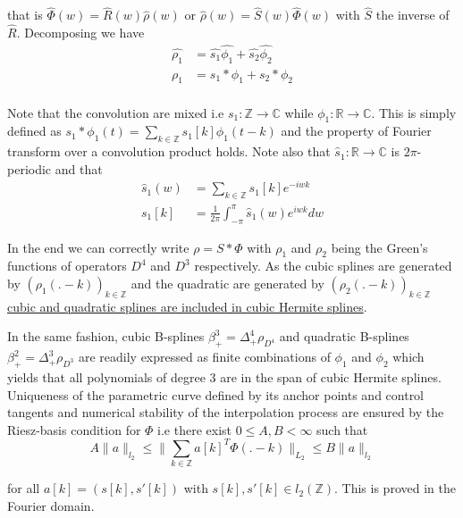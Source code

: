 \documentclass[a4paper, 11pt]{article}
\begin{document}
that is $\hat{\Phi}(w) = \hat{R}(w) \hat{\rho}(w)$ or $\hat{\rho}(w) = \hat{S}(w) \hat{\Phi}(w)$ with $\hat{S}$ the 
inverse of $\hat{R}$. Decomposing we have
\begin{align}
  \hat{\rho_1} &= \hat{s_1} \hat{\phi_1} + \hat{s_2} \hat{\phi_2} \\
  \rho_1 &= s_1 * \phi_1 + s_2 * \phi_2 \\
\end{align}

Note that the convolution are mixed i.e $s_1 : \mathbb{Z} \to \mathbb{C}$ while $\phi_1 : \mathbb{R} \to \mathbb{C}$.  
This is simply defined as $s_1 * \phi_1 (t) = \sum_{k \in \mathbb{Z}} s_1[k] \phi_1(t-k)$ and the property of Fourier 
transform over a convolution product holds. Note also that $\hat{s}_1 : \mathbb{R} \to \mathbb{C}$ is $2\pi$-periodic 
and that 
\begin{align*}
  \hat{s}_1(w) &= \sum_{k \in \mathbb{Z}} s_1[k] e^{-iwk} \\
  s_1[k] &= \frac{1}{2\pi}\int_{-\pi}^{\pi} \hat{s}_1(w) e^{iwk} dw
\end{align*}

In the end we can correctly write $\rho = S * \Phi$ with $\rho_1$ and $\rho_2$ being the Green's functions of operators 
$D^4$ and $D^3$ respectively. As the cubic splines are generated by ${(\rho_1(.-k))}_{k \in \mathbb{Z}}$ and the 
quadratic are generated by ${(\rho_2(.-k))}_{k \in \mathbb{Z}}$ \underline{cubic and quadratic splines are included in 
cubic Hermite splines}. 

In the same fashion, cubic B-splines $\beta^3_+ = \Delta^4_+ \rho_{D^4}$ and quadratic B-splines $\beta^2_+ = \Delta^3_+ 
\rho_{D^3}$ are readily expressed as finite combinations of $\phi_1$ and $\phi_2$ which yields that all polynomials of 
degree 3 are in the span of cubic Hermite splines. \\

Uniqueness of the parametric curve defined by its anchor points and control tangents and numerical stability of the 
interpolation process are ensured by the Riesz-basis condition for $\Phi$ i.e there exist $0 \leq A, B < \infty$ such 
that
\begin{equation}
  A \|a\|_{l_2} \leq \| \sum_{k \in \mathbb{Z}} {a[k]}^T \Phi(.-k)\|_{L_2} \leq B \|a\|_{l_2}
\end{equation}

for all $a[k] = (s[k], s'[k])$ with $s[k], s'[k] \in {l_2}(\mathbb{Z})$. This is proved in the Fourier domain. 
\end{document}
